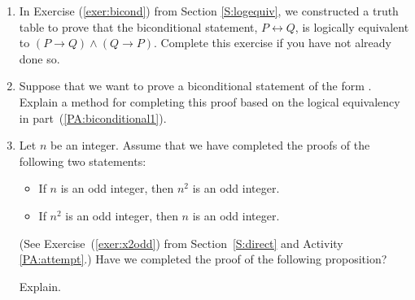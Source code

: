 \begin{previewactivity}\label{PA:biconditional} \hfill
{}%
%
%
\begin{enumerate}
  \item In Exercise (\ref{exer:bicond}) from Section \ref{S:logequiv}, we constructed a truth table to prove that the biconditional statement, $P \leftrightarrow Q$, is logically equivalent to  $\left( {P \to Q} \right) \wedge \left( {Q \to P} \right)$.  Complete this exercise if you have not already done so.  \label{PA:biconditional1}

  \item Suppose that we want to prove a biconditional statement of the form  
.  Explain a method for completing this proof based on the logical equivalency in part~(\ref{PA:biconditional1}).

  \item Let  $n$  be an integer.  Assume that we have completed the proofs of the following two statements:

  \begin{itemize}
    \item If  $n$  is an odd integer, then  $n^2 $ is an odd integer.
    \item If  $ n^2 $ is an odd integer, then  $n$  is an odd integer.
  \end{itemize}

(See Exercise~(\ref{exer:x2odd}) from Section~\ref{S:direct} and \typeu Activity \ref*{PA:attempt}.)  Have we completed the proof of the following proposition?


Explain.
 
\end{enumerate}
\hbreak
\end{previewactivity}

\endinput
